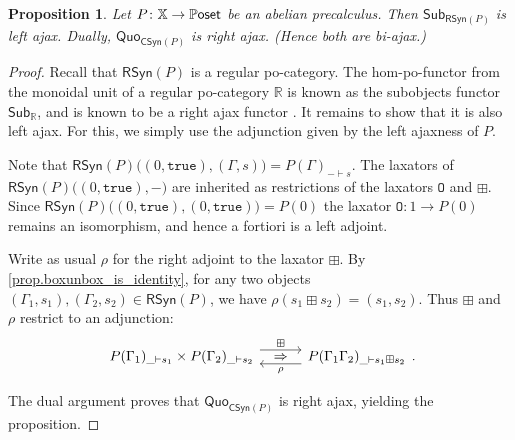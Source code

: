 \documentclass[11pt, oneside, article]{memoir}
\theoremstyle{plain}
\newtheorem{proposition}[theorem]{Proposition}
\theoremstyle{definition}
\theoremstyle{remark}
\newcommand{\const}[1]{\mathtt{#1}}%
\newcommand{\ccat}[1]{\mathbb{#1}}%
\newcommand{\Cat}[1]{{\mathsf{#1}}}%
\newcommand{\CCat}[1]{\mathbb{\StrLeft{#1}{1}}\Cat{\StrGobbleLeft{#1}{1}}}%
\newcommand{\Funr}[1]{\mathsf{#1}}%
\newcommand{\xx}{\mathbb{X}}
\newcommand{\sub}{\Funr{Sub}}
\newcommand{\quo}{\Funr{Quo}}
\newcommand{\rsyn}{\Funr{RSyn}}
\newcommand{\csyn}{\Funr{CSyn}}
\newcommand{\abc}{P} %
\newcommand{\pposet}{\CCat{Poset}}
\newcommand{\zero}{\const{O}}
\newcommand{\true}{\const{true}}
\newcommand{\adjphantom}[3][-.6pt]{\ar[#2, phantom, "#3" yshift=#1]}
\newcommand{\adj}[5][30pt]{%
\begin{tikzcd}[ampersand replacement=\&, column sep=#1]
  #2\ar[r, shift left=5pt, "{#3}"]\adjphantom{r}{\Rightarrow}\&
  #5\ar[l, shift left=5pt, "{#4}"]
\end{tikzcd}
}
\begin{document}
\begin{proposition}\label{prop.newcalc}
  Let $\abc\colon \xx \to \pposet$ be an abelian precalculus. Then $\sub_{\rsyn(\abc)}$  is left ajax. Dually, $\quo_{\csyn(\abc)}$ is right ajax. (Hence both are bi-ajax.)
\end{proposition}
\begin{proof}
  Recall that $\rsyn(\abc)$ is a regular po-category. The hom-po-functor from the monoidal unit of a regular po-category $\ccat{R}$ is known as the subobjects functor $\sub_\ccat{R}$, and is known to be a right ajax functor \cite[Theorem~3.16]{fong2018graphical}. It remains to show that it is also left ajax. For this, we simply use the adjunction given by the left ajaxness of $\abc$. 

  Note that $\rsyn(\abc)\big((0,\true),(\Gamma,s)\big)=P(\Gamma)_{- \vdash s}$. The laxators of $\rsyn(\abc)\big((0,\true),-\big)$ are inherited as restrictions of the laxators $\zero$ and $\boxplus$. Since $\rsyn(\abc)\big((0,\true),(0,\true)\big) = P(0)$ the laxator $\zero\colon 1 \to \abc(0)$ remains an isomorphism, and hence a fortiori is a left adjoint.

  Write as usual $\rho$ for the right adjoint to the laxator $\boxplus$. By \cref{prop.boxunbox_is_identity}, for any two objects $(\Gamma_1,s_1),(\Gamma_2,s_2)\in \rsyn(\abc)$, we have $\rho(s_1\boxplus s_2)=(s_1,s_2)$. Thus $\boxplus$ and $\rho$ restrict to an adjunction:
  \[
    \adj{\abc(\Gamma_1)_{\_\vdash s_1}\times\abc(\Gamma_2)_{\_\vdash s_2}}{\boxplus}{\rho}{\abc(\Gamma_1\Gamma_2)_{\_\vdash s_1\boxplus s_2}}.
  \]

  The dual argument proves that $\quo_{\csyn(\abc)}$ is right ajax, yielding the proposition.
\end{proof}
\end{document}
